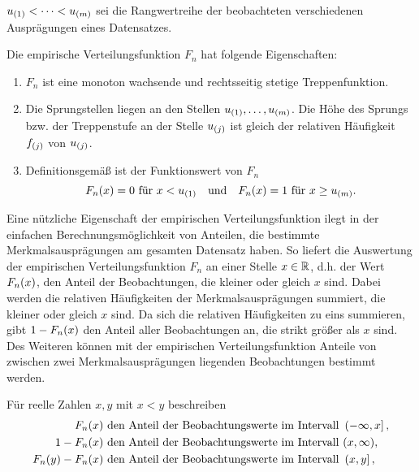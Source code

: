 \documentclass{lecture}
\begin{document}
    \begin{calcrule}
        \(u_{\parentheses*{1}} < \cdots < u_{\parentheses*{m}}\) sei die Rangwertreihe der beobachteten verschiedenen Ausprägungen eines Datensatzes.

        Die empirische Verteilungsfunktion \(F_n\) hat folgende Eigenschaften:
        \begin{enumerate}
            \item \(F_n\) ist eine monoton wachsende und rechtsseitig stetige Treppenfunktion.
            \item Die Sprungstellen liegen an den Stellen \(u_{\parentheses*{1}}, \ldots, u_{\parentheses*{m}}\).
            Die Höhe des Sprungs bzw. der Treppenstufe an der Stelle \(u_{\parentheses*{j}}\) ist gleich der relativen Häufigkeit \(f_{\parentheses*{j}}\) von \(u_{\parentheses*{j}}\).
            \item Definitionsgemäß ist der Funktionswert von \(F_n\)
            \[
                F_n\parentheses*{x} = 0\text{ für }x < u_{\parentheses*{1}} \quad \text{und} \quad F_n\parentheses*{x} = 1\text{ für }x \ge u_{\parentheses*{m}}.
            \]
        \end{enumerate}
    \end{calcrule}

    Eine nützliche Eigenschaft der empirischen Verteilungsfunktion ilegt in der einfachen Berechnungsmöglichkeit von Anteilen, die bestimmte Merkmalsausprägungen am gesamten Datensatz haben.
    So liefert die Auswertung der empirischen Verteilungsfunktion \(F_n\) an einer Stelle \(x \in \R\), d.h. der Wert \(F_n\parentheses*{x}\), den Anteil der Beobachtungen, die kleiner oder gleich \(x\) sind.
    Dabei werden die relativen Häufigkeiten der Merkmalsausprägungen summiert, die kleiner oder gleich \(x\) sind.
    Da sich die relativen Häufigkeiten zu eins summieren, gibt \(1 - F_n\parentheses*{x}\) den Anteil aller Beobachtungen an, die strikt größer als \(x\) sind.
    Des Weiteren können mit der empirischen Verteilungsfunktion Anteile von zwischen zwei Merkmalsausprägungen liegenden Beobachtungen bestimmt werden.

    \begin{calcrule}
        Für reelle Zahlen \(x, y\) mit \(x < y\) beschreiben
        \begin{align*}
            F_n\parentheses*{x} & \text{ den Anteil der Beobachtungswerte im Intervall }\left(-\infty, x\right],\\
            1 - F_n\parentheses*{x} & \text{ den Anteil der Beobachtungswerte im Intervall }\parentheses*{x, \infty},\\
            F_n\parentheses*{y} - F_n\parentheses*{x} & \text{ den Anteil der Beobachtungswerte im Intervall }\left(x, y\right],\\
        \end{align*}
    \end{calcrule}
\end{document}
